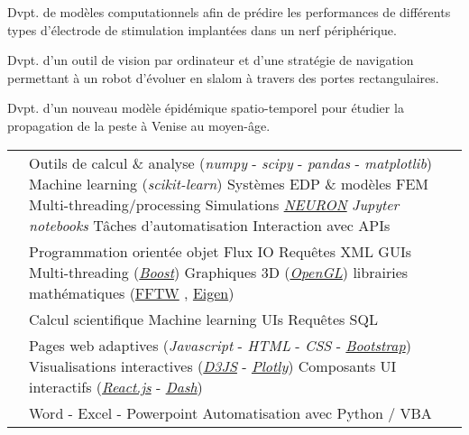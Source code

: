 \documentclass[a4paper]{cv}
\begin{document}
\begin{minipage}[t]{0.6\textwidth}
\projects

Dvpt. de modèles computationnels afin de prédire les performances de différents types d'électrode de stimulation implantées dans un nerf périphérique.
\sectionspace

Dvpt. d'un outil de vision par ordinateur et d'une stratégie de navigation permettant à un robot d'évoluer en slalom à travers des portes rectangulaires.
\sectionspace

Dvpt. d'un nouveau modèle épidémique spatio-temporel pour étudier la propagation de la peste à Venise au moyen-âge. 
\sectionspace

\techskills

\def\arraystretch{1.5}
\begin{tabular}{R{0.21\textwidth} L{0.7\textwidth}}

 & Outils de calcul \& analyse (\emph{numpy} - \emph{scipy} - \emph{pandas} - \emph{matplotlib}) \tbl{} Machine learning (\emph{scikit-learn}) \tbl{} Systèmes EDP \& modèles FEM \tbl{} Multi-threading/processing \tbl{} Simulations \href{https://neuron.yale.edu/neuron/}{\emph{NEURON}} \tbl{} \emph{Jupyter notebooks} \tbl{} Tâches d'automatisation \tbl{}Interaction avec APIs\\

 & Programmation orientée objet \tbl{} Flux IO \tbl{} Requêtes XML \tbl{} GUIs \tbl{} Multi-threading (\href{https://www.boost.org/}{\emph{Boost}}) \tbl{} Graphiques 3D (\href{https://www.opengl.org/}{\emph{OpenGL}}) \tbl{} librairies mathématiques (\href{http://fftw.org/}{FFTW} , \href{http://eigen.tuxfamily.org/index.php?title=Main_Page}{Eigen})\\

 & Calcul scientifique \tbl{} Machine learning \tbl{} UIs \tbl{} Requêtes SQL\\

 & Pages web adaptives (\emph{Javascript} - \emph{HTML} - \emph{CSS} - \href{http://getbootstrap.com/}{\emph{Bootstrap}}) \tbl{} Visualisations interactives (\href{https://d3js.org}{\emph{D3JS}} - \href{https://plot.ly/}{\emph{Plotly}}) \tbl{} Composants UI interactifs (\href{https://reactjs.org}{\emph{React.js}} - \href{https://dash.plot.ly/}{\emph{Dash}}) \\

 & Word - Excel - Powerpoint \tbl{} Automatisation avec Python / VBA\\

\end{tabular}

\vspace{5pt}
\otherskills

\end{minipage}
\end{document}
